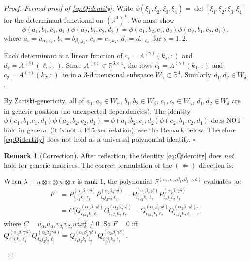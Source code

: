 \documentclass[12pt]{article}
\theoremstyle{definition}
\newtheorem{remark}[theorem]{Remark}
\newcommand{\R}{\mathbb{R}}
\begin{document}
\begin{proof}
\emph{Formal proof of \eqref{eq:Qidentity}:} Write $\phi(\xi_1,\xi_2,\xi_3,\xi_4) = \det[\xi_1;\xi_2;\xi_3;\xi_4]$ for the determinant functional on $(\R^4)^4$. We must show
\[
\phi(a_1,b_1,c_1,d_1)\phi(a_2,b_2,c_2,d_2) = \phi(a_1,b_2,c_1,d_2)\phi(a_2,b_1,c_2,d_1),
\]
where $a_s = a_{\alpha_s,i_s}$, $b_s = b_{\beta_s,j_s}$, $c_s = c_{\gamma,k_s}$, $d_s = d_{\delta,\ell_s}$ for $s=1,2$.

Each determinant is a linear function of $c_s = A^{(\gamma)}(k_s,:)$ and $d_s = A^{(\delta)}(\ell_s,:)$. Since $A^{(\gamma)} \in \R^{3\times 4}$, the rows $c_1 = A^{(\gamma)}(k_1,:)$ and $c_2 = A^{(\gamma)}(k_2,:)$ lie in a $3$-dimensional subspace $W_\gamma \subset \R^4$. Similarly $d_1,d_2 \in W_\delta$.

By Zariski-genericity, all of $a_1,a_2 \in W_\alpha$, $b_1,b_2 \in W_\beta$, $c_1,c_2 \in W_\gamma$, $d_1,d_2 \in W_\delta$ are in generic position (no unexpected dependencies). The identity $\phi(a_1,b_1,c_1,d_1)\phi(a_2,b_2,c_2,d_2) = \phi(a_1,b_2,c_1,d_2)\phi(a_2,b_1,c_2,d_1)$ does NOT hold in general (it is not a Pl\"ucker relation); see the Remark below. Therefore \eqref{eq:Qidentity} does not hold as a universal polynomial identity. $\square$

\begin{remark}[Correction]\label{rem:correction}
After reflection, the identity \eqref{eq:Qidentity} does \emph{not} hold for generic matrices. The correct formulation of the $(\Leftarrow)$ direction is:

When $\lambda = u\otimes v\otimes w\otimes x$ is rank-1, the polynomial $F^{(\alpha_1,\alpha_2,\beta_1,\beta_2,\gamma,\delta)}$ evaluates to:
\begin{align*}
F &= P^{(\alpha_1\beta_1\gamma\delta)}_{i_1j_1k_1\ell_1}P^{(\alpha_2\beta_2\gamma\delta)}_{i_2j_2k_2\ell_2}
- P^{(\alpha_1\beta_2\gamma\delta)}_{i_1j_2k_1\ell_2}P^{(\alpha_2\beta_1\gamma\delta)}_{i_2j_1k_2\ell_1} \\
&= C\bigl[Q^{(\alpha_1\beta_1\gamma\delta)}_{i_1j_1k_1\ell_1}Q^{(\alpha_2\beta_2\gamma\delta)}_{i_2j_2k_2\ell_2}
- Q^{(\alpha_1\beta_2\gamma\delta)}_{i_1j_2k_1\ell_2}Q^{(\alpha_2\beta_1\gamma\delta)}_{i_2j_1k_2\ell_1}\bigr],
\end{align*}
where $C = u_{\alpha_1}u_{\alpha_2}v_{\beta_1}v_{\beta_2}w_\gamma^2 x_\delta^2 \neq 0$. So $F = 0$ iff $Q^{(\alpha_1\beta_1\gamma\delta)}_{i_1j_1k_1\ell_1}Q^{(\alpha_2\beta_2\gamma\delta)}_{i_2j_2k_2\ell_2} = Q^{(\alpha_1\beta_2\gamma\delta)}_{i_1j_2k_1\ell_2}Q^{(\alpha_2\beta_1\gamma\delta)}_{i_2j_1k_2\ell_1}$.


\end{remark}
\end{proof}
\end{document}
